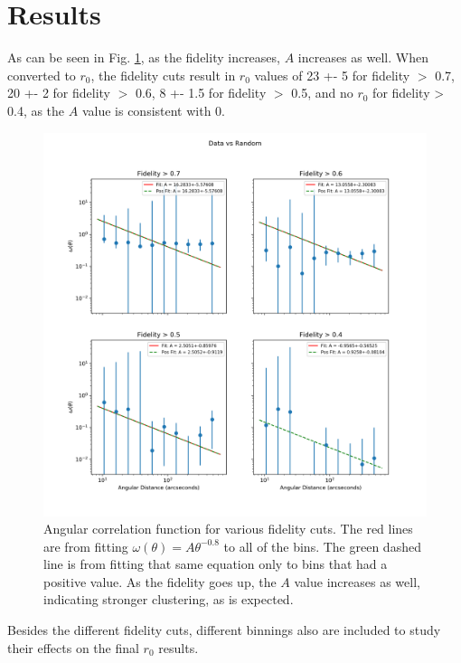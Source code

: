 \section{Results}

As can be seen in Fig. \ref{fig:Angular_correlation}, as the fidelity increases, $A$ increases as well. When converted to $r_0$, the fidelity cuts result in $r_0$ values of 23 +- 5 for fidelity $>$ 0.7, 20 +- 2 for fidelity $>$ 0.6, 8 +- 1.5 for fidelity $>$ 0.5, and no $r_0$ for fidelity > 0.4, as the $A$ value is consistent with 0.

\begin{figure}[tbp]
\centering \includegraphics[width=120mm]{Fidelity/Log_4Panel_Data_Vs_Random_bin10_NFalse_Num10000.png}
\caption{Angular correlation function for various fidelity cuts. The red lines are from fitting $\omega(\theta) = A\theta^{-0.8} $ to all of the bins. The green dashed line is from fitting that same equation only to bins that had a positive value. As the fidelity goes up, the $A$ value increases as well, indicating stronger clustering, as is expected.}
\label{fig:Angular_correlation}
\end{figure}

Besides the different fidelity cuts, different binnings also are included to study their effects on the final $r_0$ results. 

